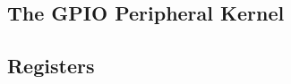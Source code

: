 \subsection{The GPIO Peripheral Kernel}
\label{subsec:gpiofunc02}


\subsection{Registers}


%
%
%
%
%
%
%
%
%
